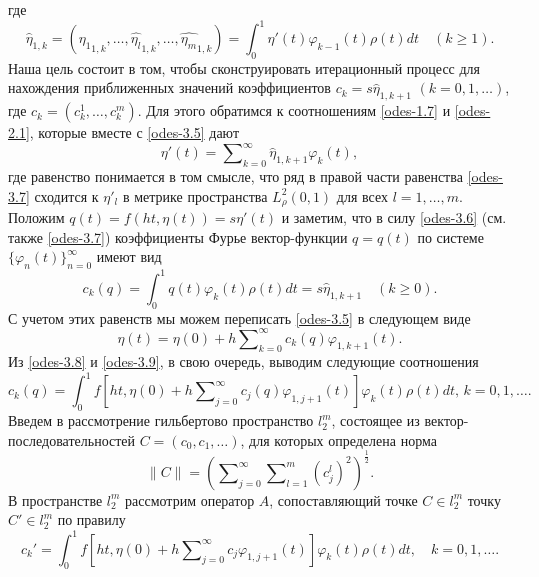 где
  \begin{equation}\label{odes-3.6}
\hat \eta_{1,k}=(\widehat{\eta_1}_{1,k},\ldots,\widehat {\eta_l}_{1,k},\ldots,\widehat{\eta_m}_{1,k})=\int_{0}^1 \eta'(t)\varphi_{k-1}(t)\rho(t)dt\quad(k\ge1).
\end{equation}
Наша цель состоит в том, чтобы сконструировать итерационный процесс для нахождения приближенных значений коэффициентов $c_k=s\hat \eta_{1,k+1}$ $(k=0,1,\ldots)$, где $c_k=(c_k^1,\ldots,c_k^m)$. Для этого обратимся к соотношениям \eqref{odes-1.7} и \eqref{odes-2.1}, которые вместе с \eqref{odes-3.5} дают
\begin{equation}\label{odes-3.7}
\eta'(t)=  \sum\nolimits_{k=0}^\infty \hat \eta_{1,k+1}\varphi_k(t),
\end{equation}
где равенство понимается в том смысле, что ряд в правой части равенства \eqref{odes-3.7} сходится к $\eta'_l$ в метрике пространства $L^2_{\rho}(0,1)$ для всех $l=1,\ldots,m$. Положим $q(t)=f(ht,\eta(t))=s\eta'(t)$ и заметим, что в силу  \eqref{odes-3.6} (см. также \eqref{odes-3.7}) коэффициенты Фурье вектор-функции $q=q(t)$ по системе  $\{\varphi_{n}(t)\}_{n=0}^\infty$ имеют вид
\begin{equation}\label{odes-3.8}
 c_k(q)=\int_{0}^1 q(t)\varphi_{k}(t)\rho(t)dt=s\hat \eta_{1,k+1} \quad (k\ge0).
\end{equation}
С учетом этих равенств мы можем переписать \eqref{odes-3.5} в следующем виде
\begin{equation}\label{odes-3.9}
\eta(t)= \eta(0)+ h\sum\nolimits_{k=0}^\infty c_k(q){\varphi}_{1,k+1}(t).
\end{equation}
Из  \eqref{odes-3.8} и \eqref{odes-3.9}, в свою очередь, выводим следующие соотношения
\begin{equation}\label{odes-3.10}
c_k(q)=\int_{0}^1f\left[ht,\eta(0)+ h\sum\nolimits_{j=0}^\infty c_j(q)\varphi_{1,j+1}(t)\right]\varphi_k(t)\rho(t) dt,\, k=0,1,\ldots.
\end{equation}
Введем в рассмотрение гильбертово пространство $l_2^m$, состоящее из вектор-после\-дователь\-ностей $C=(c_0,c_1,\ldots)$, для которых определена норма
$$\|C\|=\left(\sum\nolimits_{j=0}^\infty \sum\nolimits_{l=1}^{m}(c_j^l)^2\right)^\frac12.$$  В пространстве $l_2^m$ рассмотрим оператор $A$, сопоставляющий точке $C\in l_2^m$ точку $C'\in l_2^m$ по правилу
\begin{equation}\label{odes-3.11}
c_k'=\int_{0}^1f\left[ht,\eta(0)+ h\sum\nolimits_{j=0}^\infty c_j
\varphi_{1,j+1}(t)\right]\varphi_k(t)\rho(t) dt,\quad k=0,1,\ldots.
\end{equation}
